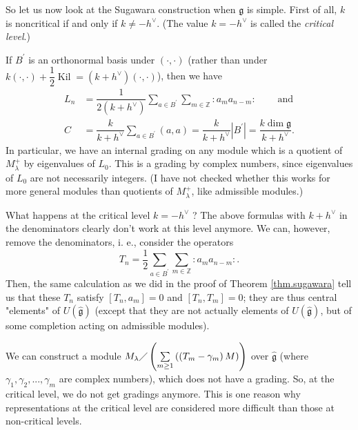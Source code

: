 \documentclass
[numbers=enddot,12pt,final,onecolumn,german,notitlepage]{scrartcl}%
\theoremstyle{definition}
\begin{document}
So let us now look at the Sugawara construction when $\mathfrak{g}$ is simple.
First of all, $k$ is noncritical if and only if $k\neq-h^{\vee}$. (The value
$k=-h^{\vee}$ is called the \textit{critical level}.)

If $B^{\prime}$ is an orthonormal basis under $\left(  \cdot,\cdot\right)  $
(rather than under $k\left(  \cdot,\cdot\right)  +\dfrac{1}{2}%
\operatorname*{Kil}=\left(  k+h^{\vee}\right)  \left(  \cdot,\cdot\right)  $),
then we have%
\begin{align*}
L_{n}  &  =\dfrac{1}{2\left(  k+h^{\vee}\right)  }\sum\limits_{a\in B^{\prime
}}\sum\limits_{m\in\mathbb{Z}}\left.  :a_{m}a_{n-m}:\right.
\ \ \ \ \ \ \ \ \ \ \text{and}\\
C  &  =\dfrac{k}{k+h^{\vee}}\sum\limits_{a\in B^{\prime}}\left(  a,a\right)
=\dfrac{k}{k+h^{\vee}}\left\vert B^{\prime}\right\vert =\dfrac{k\dim
\mathfrak{g}}{k+h^{\vee}}.
\end{align*}
In particular, we have an internal grading on any module which is a quotient
of $M_{\lambda}^{+}$ by eigenvalues of $L_{0}$. This is a grading by complex
numbers, since eigenvalues of $L_{0}$ are not necessarily integers. (I have
not checked whether this works for more general modules than quotients of
$M_{\lambda}^{+}$, like admissible modules.)

What happens at the critical level $k=-h^{\vee}$ ? The above formulas with
$k+h^{\vee}$ in the denominators clearly don't work at this level anymore. We
can, however, remove the denominators, i. e., consider the operators%
\[
T_{n}=\dfrac{1}{2}\sum\limits_{a\in B^{\prime}}\sum\limits_{m\in\mathbb{Z}%
}\left.  :a_{m}a_{n-m}:\right.  .
\]
Then, the same calculation as we did in the proof of Theorem
\ref{thm.sugawara} tell us that these $T_{n}$ satisfy $\left[  T_{n}%
,a_{m}\right]  =0$ and $\left[  T_{n},T_{m}\right]  =0$; they are thus central
"elements" of $U\left(  \widehat{\mathfrak{g}}\right)  $ (except that they are
not actually elements of $U\left(  \widehat{\mathfrak{g}}\right)  $, but of
some completion acting on admissible modules).

We can construct a module $M_{\lambda}\diagup\left(  \sum\limits_{m\geq
1}\left(  \left(  T_{m}-\gamma_{m}\right)  M\right)  \right)  $ over
$\widehat{\mathfrak{g}}$ (where $\gamma_{1},\gamma_{2},...,\gamma_{m}$ are
complex numbers), which does not have a grading. So, at the critical level, we
do not get gradings anymore. This is one reason why representations at the
critical level are considered more difficult than those at non-critical levels.
\end{document}
